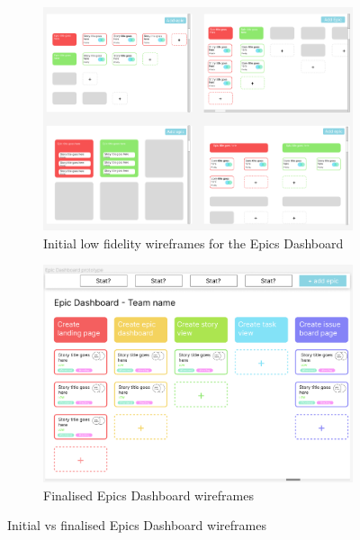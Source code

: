 \documentclass[l4proj.tex]{subfiles}
\begin{document}
\begin{figure}[h!]
\centering
\begin{subfigure}{.5\textwidth}
\centering
\includegraphics[scale=0.4]{dissertation/images/FigmaProtoyping.png}
\caption{Initial low fidelity wireframes for the Epics Dashboard}
\end{subfigure}%
\begin{subfigure}{.5\textwidth}
\centering
\includegraphics[scale=0.37]{dissertation/images/FinalisedEpicDashboardDesign.png}
\caption{Finalised Epics Dashboard wireframes}
\end{subfigure}

\caption{Initial vs finalised Epics Dashboard wireframes}
\label{fig:figma designs}
\end{figure}
\end{document}
